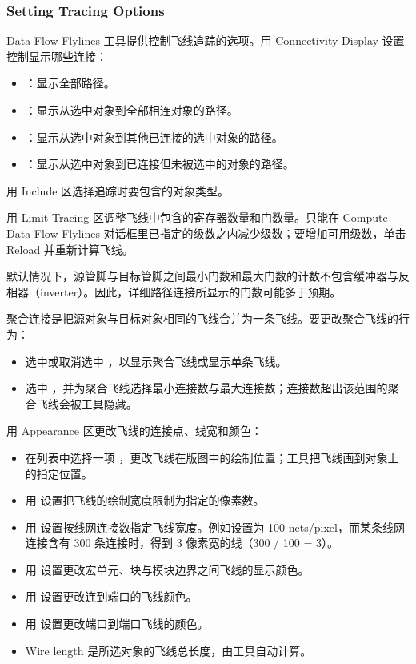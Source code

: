 \subsubsection*{Setting Tracing Options}

Data Flow Flylines 工具提供控制飞线追踪的选项。用 Connectivity Display 设置控制显示哪些连接：
\begin{itemize}
  \item {}：显示全部路径。
  \item {}：显示从选中对象到全部相连对象的路径。
  \item {}：显示从选中对象到其他已连接的选中对象的路径。
  \item {}：显示从选中对象到已连接但未被选中的对象的路径。
\end{itemize}

用 Include 区选择追踪时要包含的对象类型。

用 Limit Tracing 区调整飞线中包含的寄存器数量和门数量。只能在 Compute Data Flow Flylines 对话框里已指定的级数之内减少级数；要增加可用级数，单击 Reload 并重新计算飞线。

\begin{noteBox}
默认情况下，源管脚与目标管脚之间最小门数和最大门数的计数不包含缓冲器与反相器（inverter）。因此，详细路径连接所显示的门数可能多于预期。
\end{noteBox}

聚合连接是把源对象与目标对象相同的飞线合并为一条飞线。要更改聚合飞线的行为：
\begin{itemize}
  \item 选中或取消选中 ，以显示聚合飞线或显示单条飞线。
  \item 选中 ，并为聚合飞线选择最小连接数与最大连接数；连接数超出该范围的聚合飞线会被工具隐藏。
\end{itemize}

用 Appearance 区更改飞线的连接点、线宽和颜色：
\begin{itemize}
  \item 在列表中选择一项 ，更改飞线在版图中的绘制位置；工具把飞线画到对象上的指定位置。
  \item 用  设置把飞线的绘制宽度限制为指定的像素数。
  \item 用  设置按线网连接数指定飞线宽度。例如设置为 100 nets/pixel，而某条线网连接含有 300 条连接时，得到 3 像素宽的线（300 / 100 = 3）。
  \item 用  设置更改宏单元、块与模块边界之间飞线的显示颜色。
  \item 用  设置更改连到端口的飞线颜色。
  \item 用  设置更改端口到端口飞线的颜色。
  \item Wire length 是所选对象的飞线总长度，由工具自动计算。
\end{itemize}

